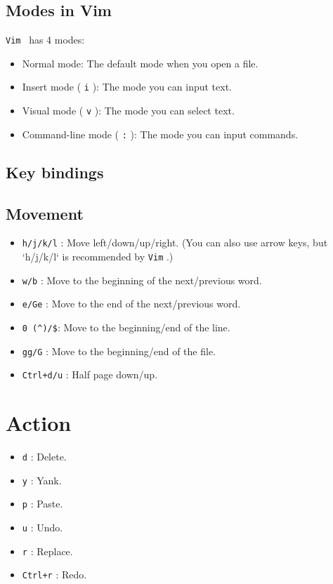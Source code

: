 \documentclass[lang=en,color=blue,12pt]{elegantbook}
\let\oldtexttt\texttt
\renewcommand{\texttt}[1]{%
  \begingroup
  \setlength{\fboxsep}{1pt}%
  \colorbox{gray!10}{\oldtexttt{#1}}%
  \endgroup
}
\begin{document}
\subsection{Modes in Vim}

\texttt{Vim}\ has 4 modes:

\begin{itemize}[itemsep=0pt, parsep=0pt, topsep=0pt, partopsep=0pt]
\item Normal mode: The default mode when you open a file.
\item Insert mode (\texttt{i}): The mode you can input text.
\item Visual mode (\texttt{v}): The mode you can select text.
\item Command-line mode (\texttt{:}): The mode you can input commands.
\end{itemize}

\subsection{Key bindings}

\subsection*{Movement}
\begin{itemize}[itemsep=0pt, parsep=0pt, topsep=0pt, partopsep=0pt]
\item \texttt{h/j/k/l}: Move left/down/up/right. (You can also use arrow keys, but `h/j/k/l` is recommended by \texttt{Vim}.) 
\item \texttt{w/b}: Move to the beginning of the next/previous word.
\item \texttt{e/Ge}: Move to the end of the next/previous word.
\item \verb|0 (^)/$|: Move to the beginning/end of the line.
\item \texttt{gg/G}: Move to the beginning/end of the file.
\item \texttt{Ctrl+d/u}: Half page down/up.
\end{itemize}

\section*{Action}

\begin{itemize}[itemsep=0pt, parsep=0pt, topsep=0pt, partopsep=0pt]
\item \texttt{d}: Delete.
\item \texttt{y}: Yank.
\item \texttt{p}: Paste.
\item \texttt{u}: Undo.
\item \texttt{r}: Replace.
\item \texttt{Ctrl+r}: Redo.
\end{itemize}
\end{document}
